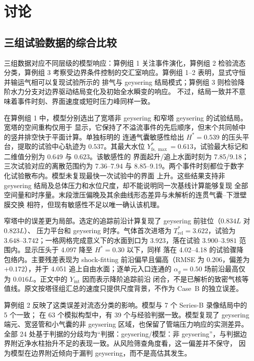 \section{讨论}
\label{sec:discussion}

\subsection{三组试验数据的综合比较}

三组数据对应不同层级的模型响应：算例组 1 关注事件演化，算例组 2 检验流态分类，算例组 3
考察受边界条件控制的交汇室响应。算例组 1--2 表明，显式守恒并输运气相可以复现试验所示的
排气与 geysering 结局模式；算例组 3 则检验降阶水力分支对边界驱动结局变化及初始全水瞬变的响应。
不过，结局一致并不意味着事件时刻、界面速度或短时压力峰同样一致。

在算例组 1 中，模型分别选出了宽塔非 geysering 和窄塔 geysering 的试验结局。宽塔的空间重构仅用于
显示，它保持了不溢流事件的先后顺序，但末个共同帧中的竖井排空快于平面计算。单独标明的
连通气囊敏感性给出 $H^*=0.539$ 的压头平台，提取的试验中心轨迹为 $0.537$。其最大水位
$Y^*_{\mathrm{fs},\max}=0.613$，试验最大标记和二维值分别为 $0.649$ 与 $0.623$。该敏感性的
界面起升/追上水面时刻为 7.85/9.18；三次试验对应的离散范围约为 7.36--7.94 与
8.85--9.19。两个事件时刻都位于数字化试验散布内。\mbox{模型未复现}最快一次试验中的界面
上升。这些结果支持非 geysering 结局及总体压力和水位尺度，却不能说明同一次基线计算能够复现
全部空间量和时序量。末段泄压偏晚及其余曲线形态差异与未解析的连贯气囊--下泄壁膜交换
相符，但现有敏感性不足以唯一确认该机理。

窄塔中的误差更为局部。选定的追踪前沿计算复现了 geysering 前驻位（$0.834L$ 对 $0.823L$）、
压力平台和 geysering 时序。气体首次进塔为
$T_{\mathrm{rel}}^{*}=3.622$，试验为 $3.648$--$3.742$；一格网格完成意义下的水面到口为
3.923，落在试验 $3.900$--$3.981$ 范围内。显示压头于 4.097 降至 $H^*=0.30$ 以下，同样
落在 4.02--4.18 的试验骤降包络内。主要残差表现为 shock-fitting 前沿偏早且偏高（RMSE 为
$0.206$，偏差为 $+0.172$），并于 4.051 追上自由水面；逐单元入口连通的
$\alpha_g=0.50$ 场前沿最高仅为 $0.016L$。正文中的 $Y_{\mathrm{int}}$ 因而表示降阶追踪前沿
闭合，不是已解析的致密气核等值线。原文按塔径组汇总的速度只提供尺度背景，不作为 Case~B
的独立误差。

算例组 2 反映了这类误差对流态分类的影响。模型与 7 个 Series-B 录像结局中的 5 个一致；
在 63 个模拟构型中，有 39 个与经验判据一致。模型复现了 geysering 端元、宽竖管和小气囊的非 geysering
区域，也保留了管端压力响应的实测差异。全部 24 处基于判据的分歧均为“判据：geysering/模型：非
geysering”，与判据边界附近净水柱抬升不足的表现一致。从风险筛查角度看，这一偏差并不保守，
因为模型在边界附近倾向于漏判 geysering，而不是高估其发生。

